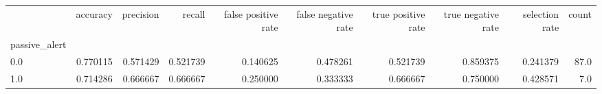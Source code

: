 \begin{tabular}{lrrrrrrrrr}
\toprule
{} &  accuracy &  precision &    recall &  false positive rate &  false negative rate &  true positive rate &  true negative rate &  selection rate &  count \\
passive\_alert &           &            &           &                      &                      &                     &                     &                 &        \\
\midrule
0.0           &  0.770115 &   0.571429 &  0.521739 &             0.140625 &             0.478261 &            0.521739 &            0.859375 &        0.241379 &   87.0 \\
1.0           &  0.714286 &   0.666667 &  0.666667 &             0.250000 &             0.333333 &            0.666667 &            0.750000 &        0.428571 &    7.0 \\
\bottomrule
\end{tabular}
